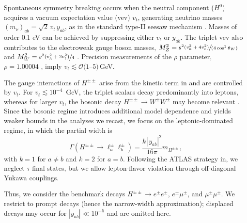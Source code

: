 \documentclass[aps, prev, twocolumn, preprintnumbers, floatfix, nofootinbib]{revtex4-1}
\begin{document}
Spontaneous symmetry breaking occurs when the neutral component ($H^0$) acquires a vacuum expectation value (vev) $v_t$, generating neutrino masses $(m_\nu)_{ab}= \sqrt{2}\, v_t\, y_{ab}$, as in the standard type-II seesaw mechanism \cite{BhupalDev:2013xol}. Masses of order $0.1$ eV can be achieved by suppressing either $v_t$ or $y_{ab}$. The triplet vev also contributes to the electroweak gauge boson masses, $M_Z^2=\sfrac{g^2(v_h^2+4v_t^2)}{(4\cos^2\theta_W)}$ and $M_W^2= \sfrac{g^2(v_h^2+2v_t^2)}{4}$ \cite{Ghosh:2017pxl}. Precision measurements of the $\rho$ parameter, $\rho=1.00004$ \cite{ParticleDataGroup:2024cfk}, imply $v_t \lesssim \mathcal{O}(1$--$5)\,$GeV.


The gauge interactions of $H^{\pm\pm}$ arise from the kinetic term in  and are controlled by $v_t$. For $v_t \lesssim 10^{-4}$~GeV, the triplet scalars decay predominantly into leptons, whereas for larger $v_t$, the bosonic decay $H^{\pm\pm}\to W^\pm W^\pm$ may become relevant \cite{Ghosh:2017pxl}. Since the bosonic regime introduces additional model dependence and yields weaker bounds in the analyses we recast, we focus on the leptonic-dominated regime, in which the partial width is \cite{Crivellin:2018ahj}
\begin{equation}
\Gamma(H^{\pm\pm} \rightarrow \ell_a^\pm \ell_b^\pm) = \frac{k\, |y_{ab}|^2}{16\pi} m_{H^{\pm\pm}},
\end{equation}
with $k=1$ for $a\neq b$ and $k=2$ for $a=b$. Following the ATLAS strategy in, we neglect $\tau$ final states, but we allow lepton-flavor violation through off-diagonal Yukawa couplings.

Thus, we consider the benchmark decays $H^{\pm\pm}\to e^\pm e^\pm$, $e^\pm\mu^\pm$, and $\mu^\pm\mu^\pm$. We restrict to prompt decays (hence the narrow-width approximation); displaced decays may occur for $|y_{ab}|\ll 10^{-5}$ \cite{Han:2007bk, Dev:2018kpa, Antusch:2018svb} and are omitted here.
\end{document}
